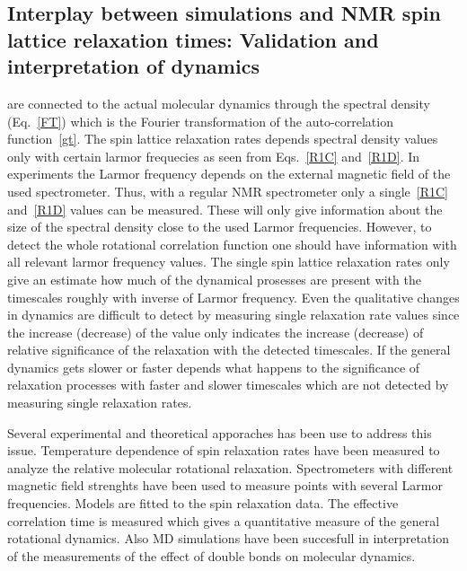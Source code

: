 \documentclass[aps,prl,superscriptaddress,twocolumn]{revtex4}
\begin{document}
\subsection{Interplay between simulations and NMR spin lattice relaxation times: Validation and interpretation of dynamics}

are connected to the actual molecular dynamics through the spectral density (Eq.~\ref{FT}) which is the Fourier transformation
of the auto-correlation function~\ref{gt}. The spin lattice relaxation rates depends spectral density values only 
with certain larmor frequecies as seen from Eqs.~\ref{R1C} and~\ref{R1D}. In experiments the Larmor frequency 
depends on the external magnetic field of the used spectrometer. Thus, with a regular NMR spectrometer only
a single~\ref{R1C} and~\ref{R1D} values can be measured. These will only give information about the size
of the spectral density close to the used Larmor frequencies. However, to detect the whole rotational
correlation function one should have information with all relevant larmor frequency values. 
The single spin lattice relaxation rates only give an estimate how much of the dynamical prosesses
are present with the timescales roughly with inverse of Larmor frequency. Even the qualitative
changes in dynamics are difficult to detect by measuring single relaxation rate values since the
increase (decrease) of the value only indicates the increase (decrease) of relative significance 
of the relaxation with the detected timescales. If the general dynamics gets slower or faster depends
what happens to the significance of relaxation processes with faster and slower timescales which 
are not detected by measuring single relaxation rates.

Several experimental and theoretical apporaches has been use to address this issue.
Temperature dependence of spin relaxation rates have been measured to analyze the relative 
molecular rotational relaxation. 
Spectrometers with different magnetic field strenghts have been used to measure points with 
several Larmor frequencies.
Models are fitted to the spin relaxation data.
The effective correlation time is measured which gives a quantitative measure of the general 
rotational dynamics. Also MD simulations have been succesfull in interpretation of the 
measurements of the effect of double bonds on molecular dynamics. 
\end{document}
